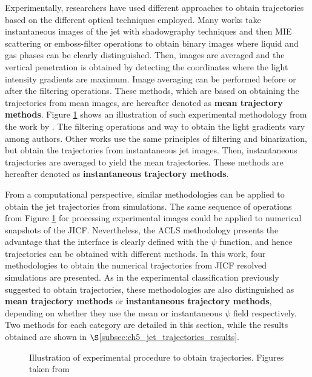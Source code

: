 Experimentally, researchers have used different approaches to obtain trajectories based on the different optical techniques employed. Many works  take instantaneous images of the jet with shadowgraphy techniques and then MIE scattering or emboss-filter operations to obtain binary images where liquid and gas phases can be clearly distinguished. Then, images are averaged and the vertical penetration is obtained by detecting the coordinates where the light intensity gradients are maximum. Image averaging can be performed before or after the filtering operations. These methods, which are based on obtaining the trajectories from mean images, are hereafter denoted as \textbf{mean trajectory methods}. Figure \ref{fig:expe_obtention_of_trajectories} shows an illustration of such experimental methodology from the work by . The filtering operations and way to obtain the light gradients vary among authors. Other works  use the same principles of filtering and binarization, but obtain the trajectories from instantaneous jet images. Then, instantaneous trajectories are averaged to yield the mean trajectories. These methods are hereafter denoted as \textbf{instantaneous trajectory methods}.

From a computational perspective, similar methodologies can be applied to obtain the jet trajectories from simulations. The same sequence of operations from Figure \ref{fig:expe_obtention_of_trajectories} for processing experimental images could be applied to numerical snapshots of the JICF. Nevertheless, the ACLS methodology presents the advantage that the interface is clearly defined with the $\psi$ function, and hence trajectories can be obtained with different methods. In this work, four methodologies to obtain the numerical trajectories from JICF resolved simulations are presented. As in the experimental classification previously suggested to obtain trajectories, these methodologies are also distinguished as \textbf{mean trajectory methods} or \textbf{instantaneous trajectory methods}, depending on whether they use the mean or instantaneous $\psi$ field respectively. Two methods for each category are detailed in this section, while the results obtained are shown in $\S$\ref{subsec:ch5_jet_trajectories_results}.

\begin{figure}[ht]
     \centering
     \caption{Illustration of experimental procedure to obtain trajectories. Figures taken from }
      \label{fig:expe_obtention_of_trajectories}
\end{figure}


